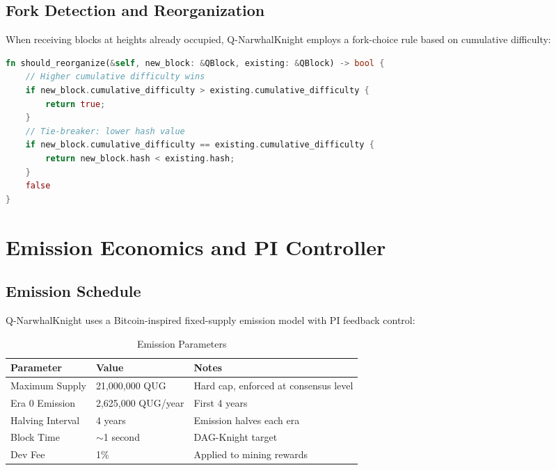 \documentclass[11pt,a4paper]{article}
\begin{document}
\subsection{Fork Detection and Reorganization}

When receiving blocks at heights already occupied, Q-NarwhalKnight employs a fork-choice rule based on cumulative difficulty:

\begin{lstlisting}[language=Rust, caption={Fork choice rule}]
fn should_reorganize(&self, new_block: &QBlock, existing: &QBlock) -> bool {
    // Higher cumulative difficulty wins
    if new_block.cumulative_difficulty > existing.cumulative_difficulty {
        return true;
    }
    // Tie-breaker: lower hash value
    if new_block.cumulative_difficulty == existing.cumulative_difficulty {
        return new_block.hash < existing.hash;
    }
    false
}
\end{lstlisting}

\section{Emission Economics and PI Controller}

\subsection{Emission Schedule}

Q-NarwhalKnight uses a Bitcoin-inspired fixed-supply emission model with PI feedback control:

\begin{table}[H]
\centering
\begin{tabular}{lll}
\toprule
\textbf{Parameter} & \textbf{Value} & \textbf{Notes} \\
\midrule
Maximum Supply & 21,000,000 QUG & Hard cap, enforced at consensus level \\
Era 0 Emission & 2,625,000 QUG/year & First 4 years \\
Halving Interval & 4 years & Emission halves each era \\
Block Time & $\sim$1 second & DAG-Knight target \\
Dev Fee & 1\% & Applied to mining rewards \\
\bottomrule
\end{tabular}
\caption{Emission Parameters}
\end{table}
\end{document}

